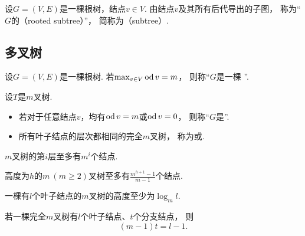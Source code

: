 \begin{definition}
设\(G = (V,E)\)是一棵根树，结点\(v \in V\).
由结点\(v\)及其所有后代导出的子图，
称为“\(G\)的（rooted subtree）”，
简称为（subtree）.
\end{definition}

\subsection{多叉树}
\begin{definition}
设\(G = (V,E)\)是一棵根树.
若\(\max_{v \in V} \operatorname{od} v = m\)，
则称“\(G\)是一棵 ”.
\end{definition}

\begin{definition}
设\(T\)是\(m\)叉树.
\begin{itemize}
	\item 若对于任意结点\(v\)，均有\(\operatorname{od} v = m\)或\(\operatorname{od} v = 0\)，
	则称“\(G\)是”.

	\item 所有叶子结点的层次都相同的完全\(m\)叉树，
	称为或.
\end{itemize}
\end{definition}

\begin{property}
\(m\)叉树的第\(i\)层至多有\(m^i\)个结点.
\end{property}

\begin{property}
高度为\(h\)的\(m\ (m\geq2)\)叉树至多有\(\frac{m^{h+1}-1}{m-1}\)个结点.
\end{property}

\begin{property}
一棵有\(l\)个叶子结点的\(m\)叉树的高度至少为\(\log_m l\).
\end{property}

\begin{property}
若一棵完全\(m\)叉树有\(l\)个叶子结点、\(t\)个分支结点，
则\begin{equation*}
	(m-1)t=l-1.
\end{equation*}
\end{property}


